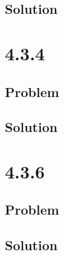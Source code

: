 \documentclass[12pt]{article}
\begin{document}
\subsection{Solution}

\newpage
\section{4.3.4}

\subsection{Problem}

\subsection{Solution}

\section{4.3.6}

\subsection{Problem}

\subsection{Solution}

\newpage


\nocite{arfken2013mathematical}
\nocite{El-Deeb_PEU-356_Assignments}
\end{document}
